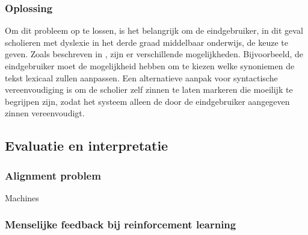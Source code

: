
\subsubsection{Oplossing}

Om dit probleem op te lossen, is het belangrijk om de eindgebruiker, in dit geval scholieren met dyslexie in het derde graad middelbaar onderwijs, de keuze te geven. Zoals beschreven in \textcite{Gooding2022}, zijn er verschillende mogelijkheden. Bijvoorbeeld, de eindgebruiker moet de mogelijkheid hebben om te kiezen welke synoniemen de tekst lexicaal zullen aanpassen. Een alternatieve aanpak voor syntactische vereenvoudiging is om de scholier zelf zinnen te laten markeren die moeilijk te begrijpen zijn, zodat het systeem alleen de door de eindgebruiker aangegeven zinnen vereenvoudigt.

\subsection{Evaluatie en interpretatie}

\subsubsection{Alignment problem}

Machines 


\subsubsection{Menselijke feedback bij reinforcement learning}

